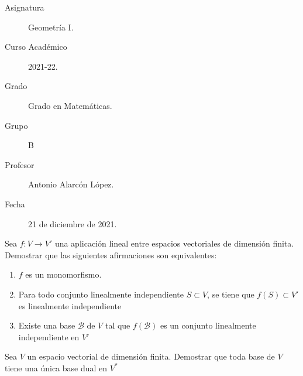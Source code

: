 \documentclass[12pt]{article}
\begin{document}
    \newcommand{\N}{{\mathbb{N}}} %
    \newcommand{\Q}{{\mathbb{Q}}} %
    \newcommand{\R}{{\mathbb{R}}} %
    \newcommand{\K}{{\mathbb{K}}} %
    
    

    \begin{description}
        \item[Asignatura] Geometría I.
        \item[Curso Académico] 2021-22.
        \item[Grado] Grado en Matemáticas.
        \item[Grupo] B
        \item[Profesor] Antonio Alarcón López.
        \item[Fecha] 21 de diciembre de 2021.
    
    \end{description}
    \newpage


    
    \begin{ejercicio}[3 puntos] Sea $f: V \rightarrow V'$ una aplicación lineal entre espacios vectoriales de dimensión finita. Demostrar que las siguientes afirmaciones son equivalentes:
    \begin{enumerate}[label=\alph*.]
        \item $f$ es un monomorfismo.
        \item Para todo conjunto linealmente independiente $S \subset V$, se tiene que $f(S) \subset V'$ es linealmente independiente
        \item Existe una base $\mathcal{B}$ de $V$ tal que $f(\mathcal{B})$ es un conjunto linealmente independiente en $V'$
    \end{enumerate}
    \end{ejercicio}
    
    \begin{ejercicio}[3 puntos] Sea $V$ un espacio vectorial de dimensión finita. Demostrar que toda base de $V$ tiene una única base dual en $V^*$
    \end{ejercicio}
\end{document}

